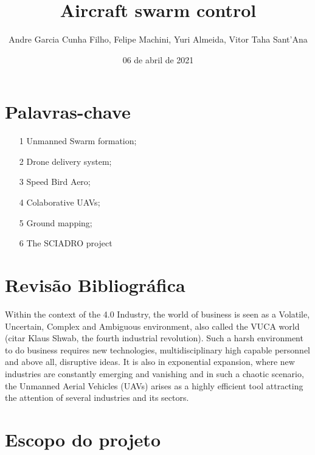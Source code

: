 \documentclass{article}
\title{Aircraft swarm control}
\author{Andre Garcia Cunha Filho, Felipe Machini, Yuri Almeida, Vitor Taha Sant'Ana}
\date{06 de abril de 2021}
\begin{document}
\maketitle

\newpage

\section{Palavras-chave}

\begin{itemize}

    \item[1] Unmanned Swarm formation;
    \item[2] Drone delivery system;
    \item[3] Speed Bird Aero;
    \item[4] Colaborative UAVs;
    \item[5] Ground mapping;
    \item[6] The SCIADRO project
    
\end{itemize}       

\section{Revisão Bibliográfica}

Within the context of the 4.0 Industry, the world of business is seen as a Volatile, Uncertain, Complex and Ambiguous environment, also called the VUCA world (citar Klaus Shwab, the fourth industrial revolution). Such a harsh environment to do business requires new technologies, multidisciplinary high capable personnel and above all, disruptive ideas. It is also in exponential expansion, where new industries are constantly emerging and vanishing and in such a chaotic scenario, the Unmanned Aerial Vehicles (UAVs) arises as a highly efficient tool attracting the attention of several industries and its sectors.

\section{Escopo do projeto}
\end{document}
